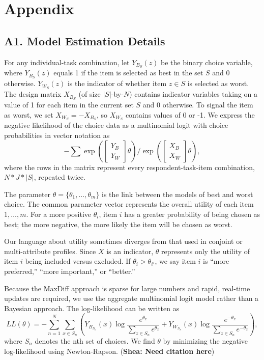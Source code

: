 \documentclass[a4paper,11pt]{article}
\begin{document}

\newpage

\section*{Appendix} 
\subsection*{A1. Model Estimation Details}
For any individual-task combination, let $Y_{B_S}(z)$ be the binary choice variable, where $Y_{B_S}(z)$ equals 1 if the item is selected as best in the set $S$ and 0 otherwise. $Y_{W_S}(z)$ is the indicator of whether item $z \in S$ is selected as worst. The design matrix $X_{B_S}$ (of size $|S|$-by-$N$) contains indicator variables taking on a value of 1 for each item in the current set $S$ and 0 otherwise. To signal the item as worst, we set $X_{W_S}=-X_{B_S}$, so $X_{W_S}$ contains values of 0 or -1. We express the negative likelihood of the choice data as a multinomial logit with choice probabilities in vector notation as
\[
-\sum
\exp{(\begin{bmatrix}Y_B\\Y_W\end{bmatrix}\theta)} / \exp{(\begin{bmatrix}X_B\\X_W\end{bmatrix}\theta)},
\]
where the rows in the matrix represent every respondent-task-item combination, $N*J*|S|$, repeated twice.  

The parameter $\theta=\{\theta_1,\ldots,\theta_m \}$ is the link between the models of best and worst choice. The common parameter vector represents the overall utility of each item $1,\ldots,m$. For a more positive $\theta_i$, item $i$ has a greater probability of being chosen as best; the more negative, the more likely the item will be chosen as worst.

Our language about utility sometimes diverges from that used in conjoint or multi-attribute profiles. Since $X$ is an indicator, $\theta$ represents only the utility of item $i$ being included versus excluded. If $\theta_i > \theta_{i'}$, we say item $i$ is ``more preferred,'' ``more important,'' or ``better.''

Because the MaxDiff approach is sparse for large numbers and rapid, real-time updates are required, we use the aggregate multinomial logit model rather than a Bayesian approach. The log-likelihood can be written as
\[
LL(\theta)=-\sum_{n=1}^N \sum_{x \in S_n} (Y_{B_{S_n}}(x)\log{\frac{e^{\theta_x}}{\sum_{z\in S_n} e^{\theta_z}}}+ Y_{W_{S_n}}(x)\log{\frac{e^{-\theta_x}}{\sum_{z\in S_n} e^{-\theta_z}}}),
\]
where $S_n$ denotes the nth set of choices. We find $\theta$ by minimizing the negative log-likelihood using Newton-Rapson. (\textbf{Shea: Need citation here}) 
\end{document}
